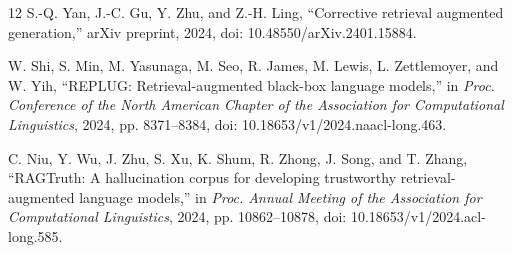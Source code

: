 \begin{thebibliography}{12}
 S.-Q. Yan, J.-C. Gu, Y. Zhu, and Z.-H. Ling, ``Corrective retrieval augmented generation,'' arXiv preprint, 2024, doi: 10.48550/arXiv.2401.15884.

 W. Shi, S. Min, M. Yasunaga, M. Seo, R. James, M. Lewis, L. Zettlemoyer, and W. Yih, ``REPLUG: Retrieval-augmented black-box language models,'' in \emph{Proc. Conference of the North American Chapter of the Association for Computational Linguistics}, 2024, pp. 8371--8384, doi: 10.18653/v1/2024.naacl-long.463.

 C. Niu, Y. Wu, J. Zhu, S. Xu, K. Shum, R. Zhong, J. Song, and T. Zhang, ``RAGTruth: A hallucination corpus for developing trustworthy retrieval-augmented language models,'' in \emph{Proc. Annual Meeting of the Association for Computational Linguistics}, 2024, pp. 10862--10878, doi: 10.18653/v1/2024.acl-long.585.

\end{thebibliography}
